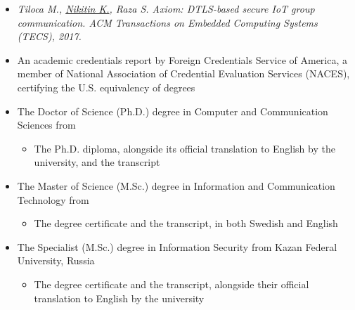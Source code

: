 \vspace{-7em}
\begin{itemize}
	\item \textit{Tiloca M., \underline{Nikitin K.}, Raza S. Axiom: {DTLS}-based
	secure {IoT} group communication. {ACM} Transactions on Embedded Computing
	Systems ({TECS}), 2017.}
\end{itemize}

\vspace{-7em}
\begin{itemize}
	\item An academic credentials report by Foreign Credentials Service of
	America, a member of National Association of Credential Evaluation Services  (NACES), certifying the U.S. equivalency of \drs degrees
	\item The Doctor of Science (Ph.D.) degree in Computer and Communication Sciences from \epfl
	\begin{itemize}
		\item The Ph.D. diploma, alongside its official translation to English
		by the university, and the transcript
	\end{itemize}
	\item The Master of Science (M.Sc.) degree in Information and Communication Technology from \kth
	\begin{itemize}
		\item The degree certificate and the transcript, in both Swedish and English
	\end{itemize}
	\item The Specialist (M.Sc.) degree in Information Security from Kazan Federal University, Russia
	\begin{itemize}
		\item The degree certificate and the transcript, alongside their
		official translation to English by the university
	\end{itemize}
\end{itemize}
\newpage

